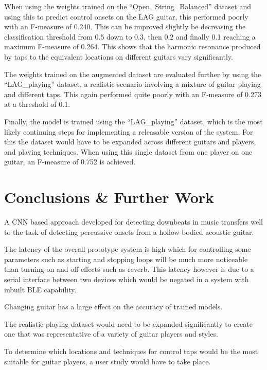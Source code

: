 \documentclass[conference]{IEEEtran}
\begin{document}
When using the weights trained on the ``Open\_String\_Balanced'' dataset and using this to predict control onsets on the LAG guitar, this performed poorly with an F-measure of 0.240. This can be improved slightly be decreasing the classification threshold from 0.5 down to 0.3, then 0.2 and finally 0.1 reaching
a maximum F-measure of 0.264. This shows that the harmonic resonance produced by taps to the equivalent locations on different guitars vary significantly.


The weights trained on the augmented dataset are evaluated further by using the ``LAG\_playing'' dataset, a realistic scenario involving a mixture of guitar playing and different taps. This again performed quite poorly with an F-measure of 0.273 at a threshold of 0.1. 

Finally, the model is trained using the ``LAG\_playing'' dataset, which is the most likely continuing steps for implementing a releasable version of the system. For this the dataset would have to be expanded across different guitars and players, and playing techniques. When using this single dataset
from one player on one guitar, an F-measure of 0.752 is achieved. 



\section{Conclusions \& Further Work}

A CNN based approach developed for detecting downbeats in music transfers well to the task of detecting percussive onsets from a hollow bodied acoustic guitar.

The latency of the overall prototype system is high which for controlling some parameters such as starting and stopping loops will be much more noticeable than turning on and off effects such as reverb. This latency however is due to a serial interface between two devices which would be 
negated in a system with inbuilt BLE capability.

Changing guitar has a large effect on the accuracy of trained models.

The realistic playing dataset would need to be expanded significantly to create one that was representative of a variety of guitar players and styles.

To determine which locations and techniques for control taps would be the most suitable for guitar players, a user study would have to take place.
\end{document}
